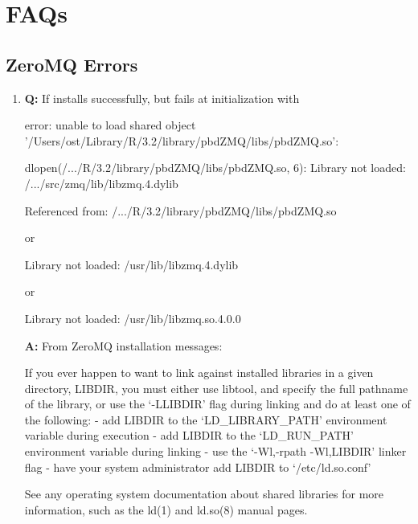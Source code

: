 
\section[FAQs]{FAQs}
\label{sec:faqs}


\subsection[ZeroMQ Errors]{ZeroMQ Errors}
\label{sec:zmq_errors}


\begin{enumerate}
\item {\bf\color{blue} Q:}
      If installs successfully, but fails at initialization with
\begin{Error}
error: unable to load shared object
'/Users/ost/Library/R/3.2/library/pbdZMQ/libs/pbdZMQ.so':

dlopen(/.../R/3.2/library/pbdZMQ/libs/pbdZMQ.so, 6):
Library not loaded: /.../src/zmq/lib/libzmq.4.dylib

Referenced from: /.../R/3.2/library/pbdZMQ/libs/pbdZMQ.so
\end{Error}
or
\begin{Error}
Library not loaded: /usr/lib/libzmq.4.dylib
\end{Error}
or
\begin{Error}
Library not loaded: /usr/lib/libzmq.so.4.0.0
\end{Error}
      {\bf\color{blue} A:}
      From ZeroMQ installation messages:
\begin{Code}
If you ever happen to want to link against installed libraries
in a given directory, LIBDIR, you must either use libtool, and
specify the full pathname of the library, or use the `-LLIBDIR'
flag during linking and do at least one of the following:
   - add LIBDIR to the `LD_LIBRARY_PATH' environment variable
     during execution
   - add LIBDIR to the `LD_RUN_PATH' environment variable
     during linking
   - use the `-Wl,-rpath -Wl,LIBDIR' linker flag
   - have your system administrator add LIBDIR to `/etc/ld.so.conf'

See any operating system documentation about shared libraries for
more information, such as the ld(1) and ld.so(8) manual pages.
\end{Code}

\end{enumerate}

